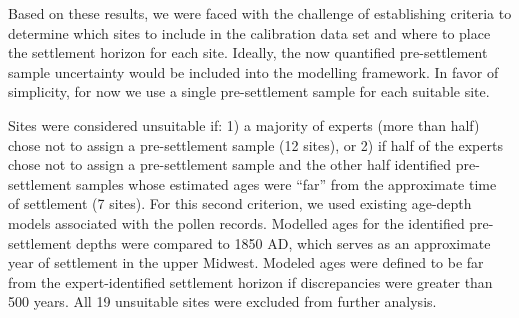 \documentclass[12pt]{article}
\begin{document}
Based on these results, we were faced with the challenge of
establishing criteria to determine which sites to include in the
calibration data set and where to place the settlement horizon for
each site. Ideally, the now quantified pre-settlement sample
uncertainty would be included into the modelling framework. In favor
of simplicity, for now we use a single pre-settlement sample for each
suitable site. 



Sites were considered unsuitable if: 1) a majority of experts (more
than half) chose not to assign a pre-settlement sample (12 sites), or
2) if half of the experts chose not to assign a pre-settlement sample
and the other half identified pre-settlement samples whose estimated
ages were “far” from the approximate time of settlement (7 sites). For
this second criterion, we used existing age-depth models associated
with the pollen records. Modelled ages for the identified
pre-settlement depths were compared to 1850 AD, which serves as an
approximate year of settlement in the upper Midwest.  Modeled ages
were defined to be far from the expert-identified settlement horizon
if discrepancies were greater than 500 years. All 19 unsuitable sites
were excluded from further analysis.
\end{document}
